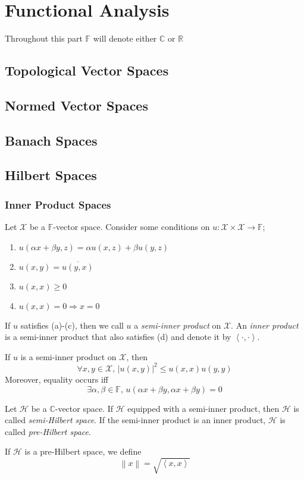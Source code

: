 \part{Functional Analysis}

Throughout this part \(\mathbb{F}\) will denote either \(\mathbb{C}\) or \(\mathbb{R}\)

\chapter{Topological Vector Spaces}

\chapter{Normed Vector Spaces}

\chapter{Banach Spaces}

\chapter{Hilbert Spaces}

\section{Inner Product Spaces}

Let \(\mathcal{X}\) be a \(\mathbb{F}\)-vector space. Consider some conditions on \(u:\mathcal{X}\times \mathcal{X} \to \mathbb{F}\);
\begin{enumerate}[label=(\alph*)]
    \item \(u(\alpha x + \beta y,z) = \alpha u(x,z) + \beta u(y,z)\)
    \item \(u(x,y)=\overline{u(y,x)}\)
    \item \(u(x,x) \ge 0\)
    \item \(u(x,x)=0 \Rightarrow x=0 \)
\end{enumerate}

If \(u\) satisfies (a)-(c), then we call \(u\) a \emph{semi-inner product} on \(\mathcal{X}\). An \emph{inner product} is a semi-inner product that also satisfies (d) and denote it by \(\left \langle \cdot,\cdot \right \rangle\).

\begin{theorem}
    If \(u\) is a semi-inner product on \(\mathcal{X}\), then
    \[\forall x,y \in \mathcal{X},\, \left \lvert u(x,y) \right \rvert^2 \le u(x,x) u(y,y)\]
    Moreover, equality occurs iff
    \[\exists \alpha,\beta \in \mathbb{F},\, u(\alpha x + \beta y,\alpha x + \beta y)=0\]
\end{theorem}

Let \(\mathcal{H}\) be a \(\mathbb{C}\)-vector space. If \(\mathcal{H}\) equipped with a semi-inner product, then \(\mathcal{H}\) is called \emph{semi-Hilbert space}. If the semi-inner product is an inner product, \(\mathcal{H}\) is called \emph{pre-Hilbert space}.

If \(\mathcal{H}\) is a pre-Hilbert space, we define
\[\left \lVert x \right \rVert = \sqrt{\left \langle x,x \right \rangle}\]